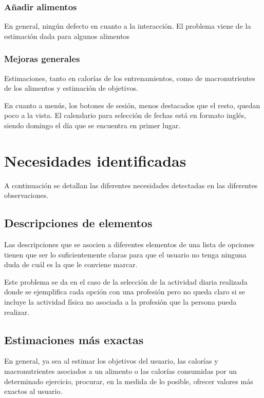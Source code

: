 \documentclass[a4paper]{article}
\begin{document}
		\subsubsection*{Añadir alimentos}
		
		En general, ningún defecto en cuanto a la interacción. El problema viene de la estimación dada para algunos alimentos
		
		\subsubsection*{Mejoras generales}
		
		Estimaciones, tanto en calorías de los entrenamientos, como de macronutrientes de los alimentos y estimación de objetivos.
		
		En cuanto a menús, los botones de sesión, menos destacados que el resto, quedan poco a la vista. El calendario para selección de fechas está en formato inglés, siendo domingo el día que se encuentra en primer lugar.
	
	

\section{Necesidades identificadas}

A continuación se detallan las diferentes necesidades detectadas en las diferentes observaciones.

	\subsection{Descripciones de elementos}
	
	Las descripciones que se asocien a diferentes elementos de una lista de opciones tienen que ser lo suficientemente claras para que el usuario no tenga ninguna duda de cuál es la que le conviene marcar.
	
	Este problema se da en el caso de la selección de la actividad diaria realizada donde se ejemplifica cada opción con una profesión pero no queda claro si se incluye la actividad física no asociada a la profesión que la persona pueda realizar.
	
	\subsection{Estimaciones más exactas}
	
	En general, ya sea al estimar los objetivos del usuario, las calorías y macronutrientes asociados a un alimento o las calorías consumidas por un determinado ejercicio, procurar, en la medida de lo posible, ofrecer valores más exactos al usuario.
	
\end{document}
